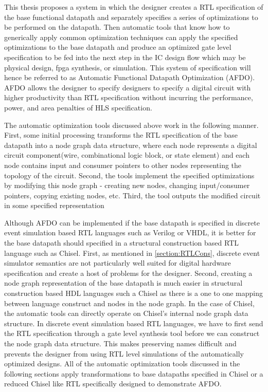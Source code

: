 This thesis proposes a system in which the designer creates a RTL specification of the base functional datapath and separately specifies a series of optimizations to be performed on the datapath. Then automatic tools that know how to generically apply common optimization techniques can apply the specified optimizations to the base datapath and produce an optimized gate level specification to be fed into the next step in the IC design flow which may be physical design, fpga synthesis, or simulation. This system of specification will hence be referred to as Automatic Functional Datapath Optimization (AFDO). AFDO allows the designer to specify designers to specify a digital circuit with higher productivity than RTL specification without incurring the performance, power, and area penalties of HLS specification.

The automatic optimization tools discussed above work in the following manner. First, some initial processing transforms the RTL specification of the base datapath into a node graph data structure, where each node represents a digital circuit component(wire, combinational logic block, or state element) and each node contains input and consumer pointers to other nodes representing the topology of the circuit. Second, the tools implement the specified optimizations by modifying this node graph - creating new nodes, changing input/consumer pointers, copying existing nodes, etc. Third, the tool outputs the modified circuit in some specified representation

Although AFDO can be implemented if the base datapath is specified in discrete event simulation based RTL languages such as Verilog or VHDL, it is better for the base datapath should specified in a structural construction based RTL language such as Chisel. First, as mentioned in \ref{section:RTLCons}, discrete event simulator semantics are not particularly well suited for digital hardware specification and create a host of problems for the designer. Second, creating a node graph representation of the base datapath is much easier in structural construction based HDL languages such a Chisel as there is a one to one mapping between language construct and nodes in the node graph. In the case of Chisel, the automatic tools can directly operate on Chisel’s internal node graph data structure. In discrete event simulation based RTL languages, we have to first send the RTL specification through a gate level synthesis tool before we can construct the node graph data structure. This makes preserving names difficult and prevents the designer from using RTL level simulations of the automatically optimized designs. All of the automatic optimization tools discussed in the following sections apply transformations to base datapaths specified in Chisel or a reduced Chisel like RTL specifically designed to demonstrate AFDO.

